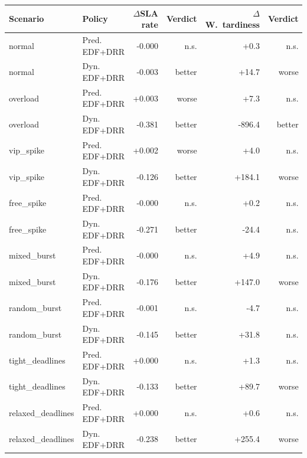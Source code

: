 \begin{tabular}{llrrrr}
\toprule
Scenario & Policy & $\Delta$SLA rate & Verdict & $\Delta$W.\ tardiness & Verdict \\
\midrule
normal & Pred. EDF+DRR & -0.000 & n.s. & +0.3 & n.s. \\
normal & Dyn. EDF+DRR & -0.003 & better & +14.7 & worse \\
overload & Pred. EDF+DRR & +0.003 & worse & +7.3 & n.s. \\
overload & Dyn. EDF+DRR & -0.381 & better & -896.4 & better \\
vip\_spike & Pred. EDF+DRR & +0.002 & worse & +4.0 & n.s. \\
vip\_spike & Dyn. EDF+DRR & -0.126 & better & +184.1 & worse \\
free\_spike & Pred. EDF+DRR & -0.000 & n.s. & +0.2 & n.s. \\
free\_spike & Dyn. EDF+DRR & -0.271 & better & -24.4 & n.s. \\
mixed\_burst & Pred. EDF+DRR & -0.000 & n.s. & +4.9 & n.s. \\
mixed\_burst & Dyn. EDF+DRR & -0.176 & better & +147.0 & worse \\
random\_burst & Pred. EDF+DRR & -0.001 & n.s. & -4.7 & n.s. \\
random\_burst & Dyn. EDF+DRR & -0.145 & better & +31.8 & n.s. \\
tight\_deadlines & Pred. EDF+DRR & +0.000 & n.s. & +1.3 & n.s. \\
tight\_deadlines & Dyn. EDF+DRR & -0.133 & better & +89.7 & worse \\
relaxed\_deadlines & Pred. EDF+DRR & +0.000 & n.s. & +0.6 & n.s. \\
relaxed\_deadlines & Dyn. EDF+DRR & -0.238 & better & +255.4 & worse \\
\bottomrule
\end{tabular}
